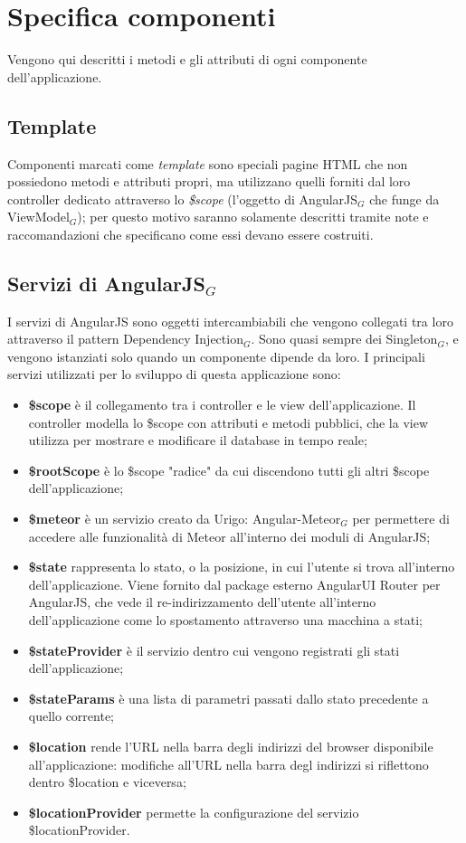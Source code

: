 \clearpage
\section{Specifica componenti}
Vengono qui descritti i metodi e gli attributi di ogni componente dell'applicazione. \\
\subsection{Template}
Componenti marcati come \textit{template} sono speciali pagine HTML che non possiedono metodi e attributi propri, ma utilizzano quelli forniti dal loro controller dedicato attraverso lo \textit{\$scope} (l'oggetto di AngularJS$_G$ che funge da ViewModel$_G$); per questo motivo saranno solamente descritti tramite note e raccomandazioni che specificano come essi devano essere costruiti.
\subsection{Servizi di AngularJS$_G$}
I servizi di AngularJS sono oggetti intercambiabili che vengono collegati tra loro attraverso il pattern Dependency Injection$_G$. Sono quasi sempre dei Singleton$_G$, e vengono istanziati solo quando un componente dipende da loro.
I principali servizi utilizzati per lo sviluppo di questa applicazione sono:
\begin{itemize}
\item \textbf{\$scope} è il collegamento tra i controller e le view dell'applicazione. Il controller modella lo \$scope con attributi e metodi pubblici, che la view utilizza per mostrare e modificare il database in tempo reale;
\item \textbf{\$rootScope} è lo \$scope "radice" da cui discendono tutti gli altri \$scope dell'applicazione;
\item \textbf{\$meteor} è un servizio creato da Urigo: Angular-Meteor$_G$ per permettere di accedere alle funzionalità di Meteor all'interno dei moduli di AngularJS;
\item \textbf{\$state} rappresenta lo stato, o la posizione, in cui l'utente si trova all'interno dell'applicazione. Viene fornito dal package esterno AngularUI Router per AngularJS, che vede il re-indirizzamento dell'utente all'interno dell'applicazione come lo spostamento attraverso una macchina a stati;
\item \textbf{\$stateProvider} è il servizio dentro cui vengono registrati gli stati dell'applicazione;
\item \textbf{\$stateParams} è una lista di parametri passati dallo stato precedente a quello corrente;
\item \textbf{\$location} rende l'URL nella barra degli indirizzi del browser disponibile all'applicazione: modifiche all'URL nella barra degl indirizzi si riflettono dentro \$location e viceversa;
\item \textbf{\$locationProvider} permette la configurazione del servizio \$locationProvider.

\end{itemize}
